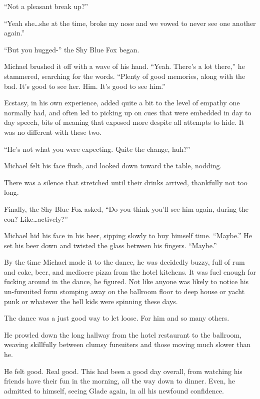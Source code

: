 ``Not a pleasant break up?''

``Yeah she\ldots{}she at the time, broke my nose and we vowed to never see one another again.''

``But you hugged-'' the Shy Blue Fox began.

Michael brushed it off with a wave of his hand.  ``Yeah.  There's a lot there,'' he stammered, searching for the words.  ``Plenty of good memories, along with the bad.  It's good to see her.  Him.  It's good to see him.''

Ecstasy, in his own experience, added quite a bit to the level of empathy one normally had, and often led to picking up on cues that were embedded in day to day speech, bits of meaning that exposed more despite all attempts to hide.  It was no different with these two.

``He's not what you were expecting.  Quite the change, huh?''

Michael felt his face flush, and looked down toward the table, nodding.

There was a silence that stretched until their drinks arrived, thankfully not too long.

Finally, the Shy Blue Fox asked, ``Do you think you'll see him again, during the con?  Like\ldots{}actively?''

Michael hid his face in his beer, sipping slowly to buy himself time.  ``Maybe.''  He set his beer down and twisted the glass between his fingers.  ``Maybe.''

\secdiv

By the time Michael made it to the dance, he was decidedly buzzy, full of rum and coke, beer, and mediocre pizza from the hotel kitchens.  It was fuel enough for fucking around in the dance, he figured.  Not like anyone was likely to notice his un-fursuited form stomping away on the ballroom floor to deep house or yacht punk or whatever the hell kids were spinning these days.

The dance was a just good way to let loose.  For him and so many others.

He prowled down the long hallway from the hotel restaurant to the ballroom, weaving skillfully between clumsy fursuiters and those moving much slower than he.

He felt good.  Real good.  This had been a good day overall, from watching his friends have their fun in the morning, all the way down to dinner.  Even, he admitted to himself, seeing Glade again, in all his newfound confidence.

